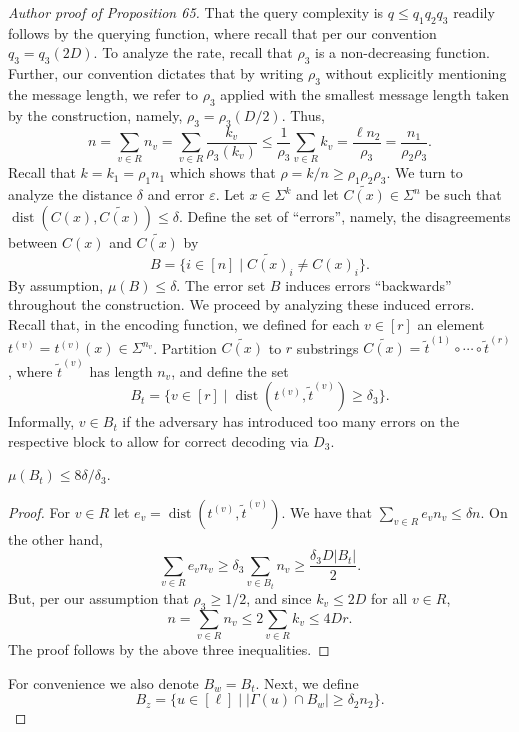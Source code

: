 \begin{proof}[Author proof of Proposition 65]
That the query complexity is $q\leq q_1q_2q_3$ readily follows by the querying function, where recall that per our convention $q_3=q_3(2D)$. To analyze the rate, recall that $\rho_3$ is a non-decreasing function. Further, our convention dictates that by writing $\rho_3$ without explicitly mentioning the message length, we refer to $\rho_3$ applied with the smallest message length taken by the construction, namely, $\rho_3=\rho_3(D/2)$. Thus,
\[n=\sum_{v\in R}n_v=\sum_{v\in R}\frac{k_v}{\rho_3(k_v)}\leq\frac1{\rho_3}\sum_{v\in R}k_v=\frac{\ell n_2}{\rho_3}=\frac{n_1}{\rho_2\rho_3}.\]
Recall that $k=k_1=\rho_1n_1$ which shows that $\rho=k/n\geq\rho_1\rho_2\rho_3$.
We turn to analyze the distance $\delta$ and error $\varepsilon$. Let $x\in\Sigma^k$ and let $\widetilde{C(x)}\in\Sigma^n$ be such that $\operatorname{dist}(C(x),\widetilde{C(x)})\leq\delta$. Define the set of ``errors'', namely, the disagreements between $C(x)$ and $\widetilde{C(x)}$ by
\[B=\{i\in[n]\mid\widetilde{C(x)}_i\ne C(x)_i\}.\]
By assumption, $\mu(B)\leq\delta$. The error set $B$ induces errors ``backwards'' throughout the construction. We proceed by analyzing these induced errors. Recall that, in the encoding function, we defined for each $v\in[r]$ an element $t^{(v)}=t^{(v)}(x)\in\Sigma^{n_v}$. Partition $\widetilde{C(x)}$ to $r$ substrings $\widetilde{C(x)}=\widetilde t^{(1)}\circ\cdots\circ\widetilde t^{(r)}$, where $\widetilde t^{(v)}$ has length $n_v$, and define the set
\[B_t=\{v\in[r]\mid\operatorname{dist}(t^{(v)},\widetilde t^{(v)})\geq\delta_3\}.\]
Informally, $v\in B_t$ if the adversary has introduced too many errors on the respective block to allow for correct decoding via $D_3$.
\begin{ntclaim} $\mu(B_t)\leq8\delta/\delta_3$.\end{ntclaim}
\begin{proof}
For $v\in R$ let $e_v=\operatorname{dist}(t^{(v)},\widetilde t^{(v)})$. We have that $\sum_{v\in R}e_vn_v\leq\delta n$. On the other hand,
\[\sum_{v\in R}e_vn_v\geq\delta_3\sum_{v\in B_t}n_v\geq\frac{\delta_3D|B_t|}{2}.\]
But, per our assumption that $\rho_3\geq1/2$, and since $k_v\leq2D$ for all $v\in R$,
\[n=\sum_{v\in R}n_v\leq2\sum_{v\in R}k_v\leq4Dr.\]
The proof follows by the above three inequalities.
\end{proof}
For convenience we also denote $B_w=B_t$. Next, we define
\begin{equation}B_z=\{u\in[\ell]\mid|\Gamma(u)\cap B_w|\geq\delta_2n_2\}.\tag{6.1}\end{equation}

\end{proof}
